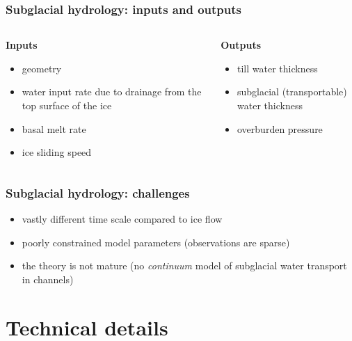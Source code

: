\documentclass[hide notes,intlimits]{beamer}
\begin{document}
\begin{frame}
  \frametitle{Subglacial hydrology: inputs and outputs}

  \begin{columns}[t]
    \begin{column}{0.5\linewidth}
      \textbf{Inputs}

      \begin{itemize}
      \item geometry
      \item water input rate due to drainage from the top surface of the ice
      \item basal melt rate
      \item ice sliding speed
      \end{itemize}
    \end{column}
    \begin{column}{0.5\linewidth}
      \textbf{Outputs}

      \begin{itemize}
      \item till water thickness
      \item subglacial (transportable) water thickness
      \item overburden pressure
      \end{itemize}
    \end{column}
  \end{columns}

\end{frame}

\begin{frame}
  \frametitle{Subglacial hydrology: challenges}

  \begin{itemize}
  \item vastly different time scale compared to ice flow
  \item poorly constrained model parameters (observations are sparse)
  \item the theory is not mature (no \emph{continuum} model of
    subglacial water transport in channels)
  \end{itemize}
\end{frame}



\section{Technical details}
\end{document}
